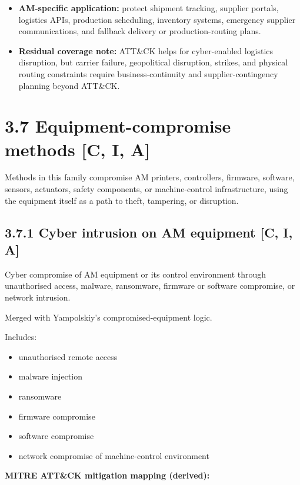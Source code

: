 \documentclass[10pt,a4paper,oneside]{report}
\begin{document}
\begin{itemize}
\item \textbf{AM-specific application:} protect shipment tracking, supplier portals, logistics APIs, production scheduling, inventory systems, emergency supplier communications, and fallback delivery or production-routing plans.
\end{itemize}

\begin{itemize}
\item \textbf{Residual coverage note:} ATT\&CK helps for cyber-enabled logistics disruption, but carrier failure, geopolitical disruption, strikes, and physical routing constraints require business-continuity and supplier-contingency planning beyond ATT\&CK.
\end{itemize}


\section{3.7 Equipment-compromise methods [C, I, A]}


Methods in this family compromise AM printers, controllers, firmware, software, sensors, actuators, safety components, or machine-control infrastructure, using the equipment itself as a path to theft, tampering, or disruption.


\subsection{3.7.1 Cyber intrusion on AM equipment [C, I, A]}


Cyber compromise of AM equipment or its control environment through unauthorised access, malware, ransomware, firmware or software compromise, or network intrusion.

Merged with Yampolskiy's compromised-equipment logic.

Includes:

\begin{itemize}
\item unauthorised remote access
\item malware injection
\item ransomware
\item firmware compromise
\item software compromise
\item network compromise of machine-control environment
\end{itemize}

\textbf{MITRE ATT\&CK mitigation mapping (derived):}
\end{document}
